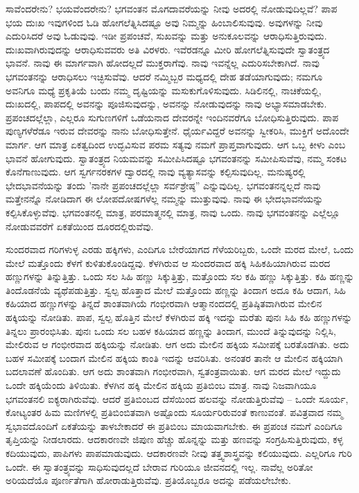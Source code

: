 ಸಾವೆಂದರೇನು? ಭಯವೆಂದರೇನು? ಭಗವಂತನ ಮೊಗದಾವರೆಯನ್ನು ನೀವು ಅದರಲ್ಲಿ ನೋಡುವುದಿಲ್ಲವೆ? ಪಾಪ ಭಯ ದುಃಖ ಇವುಗಳಿಂದ ಓಡಿ ಹೋಗಲೆತ್ನಿಸಿದಷ್ಟೂ ಅವು ನಿಮ್ಮನ್ನು ಹಿಂಬಾಲಿಸುವುವು. ಅವುಗಳನ್ನು ನೀವು ಎದುರಿಸಿದರೆ ಅವು ಓಡುವುವು. ಇಡೀ ಪ್ರಪಂಚವೆ, ಸುಖವನ್ನು ಮತ್ತು ಅನುಕೂಲವನ್ನು ಆರಾಧಿಸುತ್ತಿರುವುದು. ದುಃಖವಾಗಿರುವುದನ್ನು ಆರಾಧಿಸುವವರು ಅತಿ ವಿರಳರು. ಇವೆರಡನ್ನೂ ಮೀರಿ ಹೋಗಲೆತ್ನಿಸುವುದೇ ಸ್ವಾತಂತ್ರ್ಯದ ಭಾವನೆ. ನಾವು ಈ ಮಾರ್ಗವಾಗಿ ಹೋದಲ್ಲದೆ ಮುಕ್ತರಾಗೆವು. ನಾವು ಇವನ್ನೆಲ್ಲ ಎದುರಿಸಬೇಕಾಗಿದೆ. ನಾವು ಭಗವಂತನನ್ನು ಆರಾಧಿಸಲು ಇಚ್ಛಿಸುವೆವು. ಆದರೆ ನಮ್ಮಿಬ್ಬರ ಮಧ್ಯದಲ್ಲಿ ದೇಹ ತಡೆಯಾಗುವುದು; ನಮಗೂ ಅವನಿಗೂ ಮಧ್ಯೆ ಪ್ರಕೃತಿಯೆ ಬಂದು ನಮ್ಮ ದೃಷ್ಟಿಯನ್ನು ಮಸುಕುಗೊಳಿಸುವುದು. ಸಿಡಿಲಿನಲ್ಲಿ, ನಾಚಿಕೆಯಲ್ಲಿ, ದುಃಖದಲ್ಲಿ, ಪಾಪದಲ್ಲಿ ಅವನನ್ನು ಪೂಜಿಸುವುದನ್ನು, ಅವನನ್ನು ನೋಡುವುದನ್ನು ನಾವು ಅಭ್ಯಾಸಮಾಡಬೇಕು. ಪ್ರಪಂಚದಲ್ಲೆಲ್ಲಾ, ಎಲ್ಲರೂ ಸುಗುಣಗಳಿಗೆ ಒಡೆಯನಾದ ದೇವರನ್ನೇ ಇಂದಿನವರೆಗೂ ಬೋಧಿಸುತ್ತಿರುವುದು. ಪಾಪ ಪುಣ್ಯಗಳೆರೆಡೂ ಇರುವ ದೇವರನ್ನು ನಾನು ಬೋಧಿಸುತ್ತೇನೆ. ಧೈರ್ಯವಿದ್ದರೆ ಅವನನ್ನು ಸ್ವೀಕರಿಸಿ, ಮುಕ್ತಿಗೆ ಅದೊಂದೇ ಮಾರ್ಗ. ಆಗ ಮಾತ್ರ ಏಕತ್ವದಿಂದ ಉದ್ಭವಿಸುವ ಪರಮ ಸತ್ಯವು ನಮಗೆ ಪ್ರಾಪ್ತವಾಗುವುದು. ಆಗ ಒಬ್ಬ ಕೀಳು ಎಂಬ ಭಾವನೆ ಹೋಗುವುದು. ಸ್ವಾತಂತ್ರ್ಯದ ನಿಯಮವನ್ನು ಸಮೀಪಿಸಿದಷ್ಟೂ ಭಗವಂತನನ್ನು ಸಮೀಪಿಸುವೆವು, ನಮ್ಮ ಸಂಕಟ ಕೊನೆಗಾಣುವುದು. ಆಗ ಸ್ವರ್ಗನರಕಗಳ ದ್ವಾರದಲ್ಲಿ ನಾವು ವ್ಯತ್ಯಾಸವನ್ನು ಕಲ್ಪಿಸುವುದಿಲ್ಲ. ಮನುಷ್ಯರಲ್ಲಿ ಭೇದಭಾವನೆಯನ್ನು ತಂದು 'ನಾನೇ ಪ್ರಪಂಚದಲ್ಲೆಲ್ಲಾ ಸರ್ವಶ್ರೇಷ್ಠ” ಎನ್ನುವುದಿಲ್ಲ. ಭಗವಂತನನ್ನಲ್ಲದೆ ನಾವು ಮತ್ತೇನನ್ನೊ ನೋಡಿದಾಗ ಈ ಲೋಪದೋಷಗಳೆಲ್ಲ ನಮ್ಮನ್ನು ಮುತ್ತುವುವು. ನಾವು ಈ ಭೇದಭಾವನೆಯನ್ನು ಕಲ್ಪಿಸಿಕೊಳ್ಳುವೆವು. ಭಗವಂತನಲ್ಲಿ ಮಾತ್ರ, ಪರಮಾತ್ಮನಲ್ಲಿ ಮಾತ್ರ, ನಾವು ಒಂದು. ನಾವು ಭಗವಂತನನ್ನು ಎಲ್ಲೆಲ್ಲೂ ನೋಡುವವರೆಗೆ ಏಕತೆಯಿಂದ ದೂರದಲ್ಲಿರುವೆವು.

ಸುಂದರವಾದ ಗರಿಗಳುಳ್ಳ ಎರಡು ಹಕ್ಕಿಗಳು, ಎಂದಿಗೂ ಬೇರೆಯಾಗದ ಗೆಳೆಯರಿಬ್ಬರು, ಒಂದೇ ಮರದ ಮೇಲೆ, ಒಂದು ಮೇಲೆ ಮತ್ತೊಂದು ಕೆಳಗೆ ಕುಳಿತುಕೊಂಡಿದ್ದವು. ಕೆಳಗಿರುವ ಆ ಸುಂದರವಾದ ಹಕ್ಕಿ ಸಿಹಿಕಹಿಯಾಗಿರುವ ಮರದ ಹಣ್ಣುಗಳನ್ನು ತಿನ್ನುತ್ತಿತ್ತು. ಒಂದು ಸಲ ಸಿಹಿ ಹಣ್ಣು ಸಿಕ್ಕುತ್ತಿತ್ತು, ಮತ್ತೊಂದು ಸಲ ಕಹಿ ಹಣ್ಣು ಸಿಕ್ಕುತ್ತಿತ್ತು. ಕಹಿ ಹಣ್ಣನ್ನು ತಿಂದೊಡನೆಯೆ ವ್ಯಥೆಪಡುತ್ತಿತ್ತು. ಸ್ವಲ್ಪ ಹೊತ್ತಾದ ಮೇಲೆ ಮತ್ತೊಂದು ಹಣ್ಣನ್ನು ತಿಂದಾಗ ಅದೂ ಕಹಿ ಆದಾಗ, ಸಿಹಿ ಕಹಿಯಾದ ಹಣ್ಣುಗಳನ್ನು ತಿನ್ನದೆ ಶಾಂತವಾಗಿಯೆ ಗಂಭೀರವಾಗಿ ಆತ್ಮಾನಂದದಲ್ಲಿ ಪ್ರತಿಷ್ಠಿತವಾಗಿರುವ ಮೇಲಿನ ಹಕ್ಕಿಯನ್ನು ನೋಡಿತು. ಪಾಪ, ಸ್ವಲ್ಪ ಹೊತ್ತಿನ ಮೇಲೆ ಕೆಳಗಿರುವ ಹಕ್ಕಿ ಇದನ್ನು ಮರೆತು ಪುನಃ ಸಿಹಿ ಕಹಿ ಹಣ್ಣುಗಳನ್ನು ತಿನ್ನಲು ಪ್ರಾರಂಭಿಸಿತು. ಪುನಃ ಒಂದು ಸಲ ಬಹಳ ಕಹಿಯಾದ ಹಣ್ಣನ್ನು ತಿಂದಾಗ, ಮುಂದೆ ತಿನ್ನುವುದನ್ನು ನಿಲ್ಲಿಸಿ, ಮೇಲಿರುವ ಆ ಗಂಭೀರವಾದ ಹಕ್ಕಿಯನ್ನು ನೋಡಿತು. ಆಗ ಅದು ಮೇಲಿನ ಹಕ್ಕಿಯ ಸಮೀಪಕ್ಕೆ ಬರತೊಡಗಿತು. ಅದು ಬಹಳ ಸಮೀಪಕ್ಕೆ ಬಂದಾಗ ಮೇಲಿನ ಹಕ್ಕಿಯ ಕಾಂತಿ ಇದನ್ನು ಆವರಿಸಿತು. ಅನಂತರ ತಾನೇ ಆ ಮೇಲಿನ ಹಕ್ಕಿಯಾಗಿ ಬದಲಾವಣೆ ಹೊಂದಿತು. ಆಗ ಅದು ಶಾಂತವಾಗಿ ಗಂಭೀರವಾಗಿ, ಸ್ವತಂತ್ರವಾಯಿತು. ಆಗ ಮರದ ಮೇಲೆ ಇದ್ದುದು ಒಂದೇ ಹಕ್ಕಿಯೆಂದು ತಿಳಿಯಿತು. ಕೆಳಗಿನ ಹಕ್ಕಿ ಮೇಲಿನ ಹಕ್ಕಿಯ ಪ್ರತಿಬಿಂಬ ಮಾತ್ರ. ನಾವು ನಿಜವಾಗಿಯೂ ಭಗವಂತನಲಿ ಐಕ್ಯರಾಗಿರುವೆವು. ಆದರೆ ಪ್ರತಿಬಿಂಬದ ದೆಸೆಯಿಂದ ಹಲವನ್ನು ನೋಡುತ್ತಿರುವೆವು – ಒಂದೇ ಸೂರ್ಯ, ಕೋಟ್ಯಂತರ ಹಿಮ ಮಣಿಗಳಲ್ಲಿ ಪ್ರತಿಬಿಂಬಿತವಾಗಿ ಅಷ್ಟೊಂದು ಸೂರ್ಯರಿರುವಂತೆ ಕಾಣುವಂತೆ. ಪವಿತ್ರವಾದ ನಮ್ಮ ಸ್ವಭಾವದೊಂದಿಗೆ ಏಕತೆಯನ್ನು ತಾಳಬೇಕಾದರೆ ಈ ಪ್ರತಿಬಿಂಬ ಮಾಯವಾಗಬೇಕು. ಈ ಪ್ರಪಂಚ ನಮಗೆ ಎಂದಿಗೂ ತೃಪ್ತಿಯನ್ನು ನೀಡಲಾರದು. ಆದಕಾರಣವೇ ಜಿಪುಣ ಹೆಚ್ಚು ಹೊನ್ನನ್ನು ಮತ್ತು ಹಣವನ್ನು ಸಂಗ್ರಹಿಸುತ್ತಿರುವುದು, ಕಳ್ಳ ಕದಿಯುವುದು, ಪಾಪಿಗಳು ಪಾಪಮಾಡುವುದು. ಆದಕಾರಣವೇ ನೀವು ತತ್ತ್ವಶಾಸ್ತ್ರವನ್ನು ಕಲಿಯುವುದು. ಎಲ್ಲರಿಗೂ ಗುರಿ ಒಂದೇ. ಈ ಸ್ವಾತಂತ್ರ್ಯವನ್ನು ಸಾಧಿಸುವುದಲ್ಲದೆ ಬೇರಾವ ಗುರಿಯೂ ಜೀವನದಲ್ಲಿ ಇಲ್ಲ. ನಾವೆಲ್ಲ ಅರಿತೋ ಅರಿಯದೆಯೊ ಪೂರ್ಣತೆಗಾಗಿ ಹೋರಾಡುತ್ತಿರುವೆವು. ಪ್ರತಿಯೊಬ್ಬರೂ ಅದನ್ನು ಪಡೆಯಲೇಬೇಕು.

